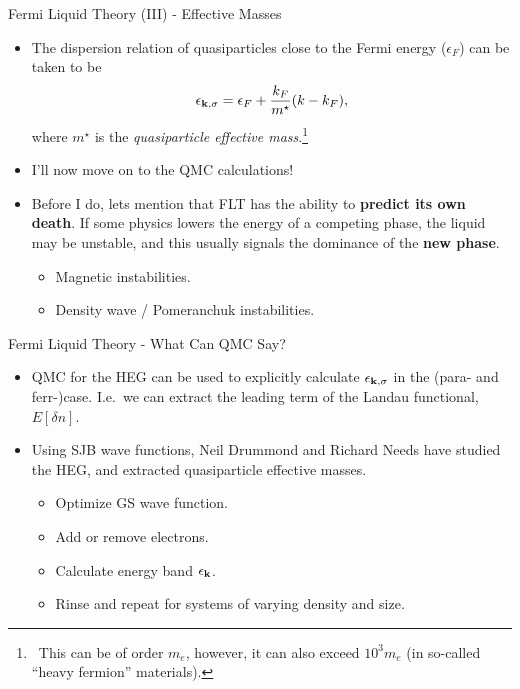 \documentclass[12pt, pdf, hyperref={draft}, usenames, dvipsnames,
aspectratio=169]{beamer}
\begin{document}
\begin{frame}{Fermi Liquid Theory (III) - Effective Masses}
\begin{itemize}
  \item The dispersion relation of quasiparticles close to the Fermi energy
  ($\epsilon_F$) can
  be taken to be
  \begin{equation}
    \epsilon_{\bf k,\sigma} = \epsilon_F + \dfrac{k_F}{m^{\star}}(k - k_F),
  \end{equation}
  where $m^{\star}$ is the \textit{quasiparticle effective mass}.\footnote{\
  This can be of order $m_e$, however, it can also exceed $10^3 m_e$ (in
  so-called ``heavy fermion'' materials).}
  \item I'll now move on to the QMC calculations!
  \item Before I do, lets mention that FLT has the ability to \textbf{predict
  its own death}. If some physics lowers the energy of a competing phase, the
  liquid may be unstable, and this usually signals the dominance of the
  \textbf{new phase}.
  \begin{itemize}
    \item Magnetic instabilities.
    \item Density wave / Pomeranchuk instabilities.
  \end{itemize}
\end{itemize}
\end{frame}


\begin{frame}{Fermi Liquid Theory - What Can QMC Say?}

\begin{itemize}
  \item QMC for the HEG can be used to explicitly calculate $\epsilon_{\bf
  k,\sigma}$ in the (para- and ferr-)\@magnetic case. I.e.\ we can extract the
  leading term of the Landau functional, $E\left[ \delta n  \right]$.
  \item Using SJB wave functions, Neil Drummond and Richard Needs have studied
  the HEG, and extracted quasiparticle effective masses.
  \begin{itemize}
    \item Optimize GS wave function.
    \item Add or remove electrons.
    \item Calculate energy band $\epsilon_{\bf k}$.
    \item Rinse and repeat for systems of varying density and size.
  \end{itemize}
\end{itemize}
\end{frame}
\end{document}
